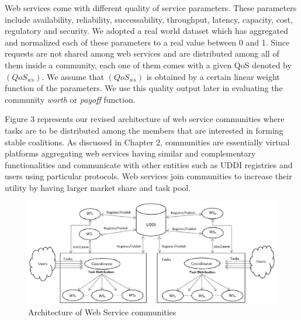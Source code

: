 Web services come with different quality of service parameters.
These parameters include availability, reliability, successability, throughput, latency, capacity, cost, regulatory and security\cite{DBLP:conf/smc/Al-MasriM09a}.
We adopted a real world dataset \cite{DBLP:conf/smc/Al-MasriM09a}
which has aggregated and normalized each of these parameters to a
real value between 0 and 1. Since requests are not shared among
web services and are distributed among all of them inside a
community, each one of them comes with a given QoS denoted by
$(QoS_{ws})$. We assume that $(QoS_{ws})$ is obtained by a certain linear weight function of the parameters. We use this quality output later in evaluating the
community \emph{worth} or \emph{payoff} function.

Figure 3 represents our revised architecture of web service
communities where tasks are to be distributed among the members
that are interested in forming stable coalitions. As discussed in
Chapter 2, communities are essentially virtual platforms
aggregating web services having similar and complementary
functionalities and communicate with other entities such as UDDI
registries and users using particular protocols. Web services join
communities to increase their utility by having larger market
share and task pool. 

\begin{figure}[!t]
\centerline{\includegraphics[width=15cm]{community.eps}}
\caption{Architecture of Web Service communities}
\label{fig_community}
\end{figure}


